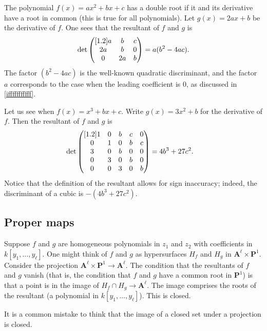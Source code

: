\documentclass[11pt, oneside,margin=1in]{article}
\begin{document}
\begin{example}[ ]\label{}\text{}
The polynomial $f(x)=ax^2+bx+c$ has a double root if it and its derivative have a root in common (this is true for all polynomials). Let $g(x)=2ax+b$ be the derivative of $f$. One sees that the resultant of $f$ and $g$ is
\begin{align*}
	\det\begin{pmatrix} [ 1.2 ] a&b&c\\2a&b&0\\0&2a&b\end{pmatrix} = a(b^2-4ac).
\end{align*}
The factor $(b^2-4ac)$ is the well-known quadratic discriminant, and the factor $a$ corresponds to the case when the leading coefficient is $0$, as discussed in \cref{ifffffffffff}.  
\end{example}

\begin{example}[ ]\label{}\text{}
Let us see when $f(x)=x^3+bx+c$. Write $g (x)= 3x^2 + b$ for the derivative of $f$. Then the resultant of $f$ and $g$ is
\begin{align*}
	\det\begin{pmatrix} [ 1.2 ] 1&0&b&c&0\\0&1&0&b&c\\3&0&b&0&0\\0&3&0&b&0\\0&0&3&0&b\end{pmatrix}&= 4b^3+27c^2.
\end{align*}
Notice that the definition of the resultant allows for sign inaccuracy; indeed, the discriminant of a cubic is $-(4b^3+27c^2)$.
\end{example}

\subsection{Proper maps}
Suppose $f$ and $g$ are homogeneous polynomials in $z_1$ and $z_2$ with coefficients in $k[y_1,\hdots, y_\ell]$. One might think of $f$ and $g$ as hypersurfaces $H_f$ and $H_g$ in $\mathbf{A}^\ell\times \mathbf{P}^1$. Consider the projection $\mathbf{A}^\ell\times \mathbf{P}^1\longrightarrow \mathbf{A}^\ell$. The condition that the resultants of $f$ and $g$ vanish (that is, the condition that $f$ and $g$ have a common root in $\mathbf{P}^1$) is that a point is in the image of $H_f\cap H_g\longrightarrow \mathbf{A}^\ell$. The image comprises the roots of the resultant (a polynomial in $k[y_1,\hdots,y_\ell]$). This is closed.

\begin{remark}
	It is a common mistake to think that the image of a closed set under a projection is closed.
\end{remark}
\end{document}

